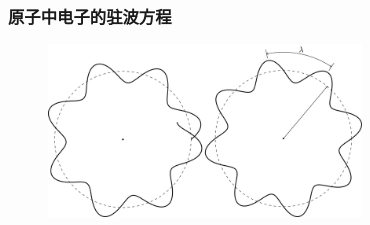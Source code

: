 \frame
{
	\frametitle{原子中电子的驻波方程}
\begin{figure}[h!]
	\vspace{-10.5pt}
\centering
\includegraphics[height=0.38\textwidth,width=0.74\textwidth,viewport=0 0 840 440,clip]{Figures/Standing_wave-atom.png}
\vskip 2pt
\label{Atomic-electron_Standing_wave}
\end{figure}
}

